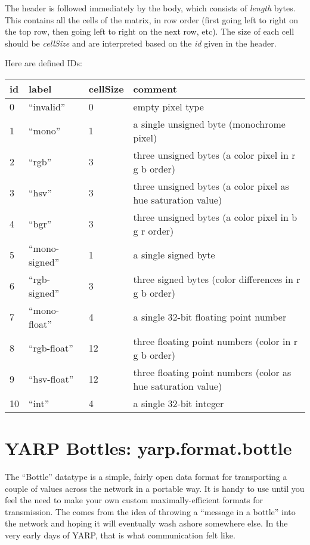 The header is followed immediately by the body, which consists
of {\em length} bytes. This contains all the cells of the matrix,
in row order (first going left to right on the top row, then 
going left to right on the next row, etc).  The size of each 
cell should be {\em cellSize} and are interpreted based on the {\em id}
given in the header.

Here are defined IDs:

\begin{tabular}{|l|l|l|l|}
\hline
{\bf id} & {\bf label} & {\bf cellSize} & {\bf comment} \\ \hline \hline
0 & ``invalid'' & 0 & empty pixel type \\
1 & ``mono'' & 1 & a single unsigned byte (monochrome pixel) \\
2 & ``rgb'' & 3 & three unsigned bytes (a color pixel in r g b order) \\
3 & ``hsv'' & 3 & three unsigned bytes (a color pixel as hue saturation value) \\
4 & ``bgr'' & 3 & three unsigned bytes (a color pixel in b g r order) \\
5 & ``mono-signed'' & 1 & a single signed byte \\
6 & ``rgb-signed'' & 3 & three signed bytes (color differences in r g b order) \\
7 & ``mono-float'' & 4 & a single 32-bit floating point number \\
8 & ``rgb-float'' & 12 & three floating point numbers (color in r g b order) \\
9 & ``hsv-float'' & 12 & three floating point numbers (color as hue saturation value) \\
10 & ``int'' & 4 & a single 32-bit integer \\ \hline
\end{tabular}



\section{YARP Bottles: yarp.format.bottle}

The ``Bottle'' datatype
is a simple, fairly open data format for transporting a couple of
values across the network in a portable way.  It is handy to use until
you feel the need to make your own custom maximally-efficient formats for
transmission. The comes from the idea of throwing a ``message in a
bottle'' into the network and hoping it will eventually wash ashore
somewhere else. In the very early days of YARP, that is what
communication felt like.

